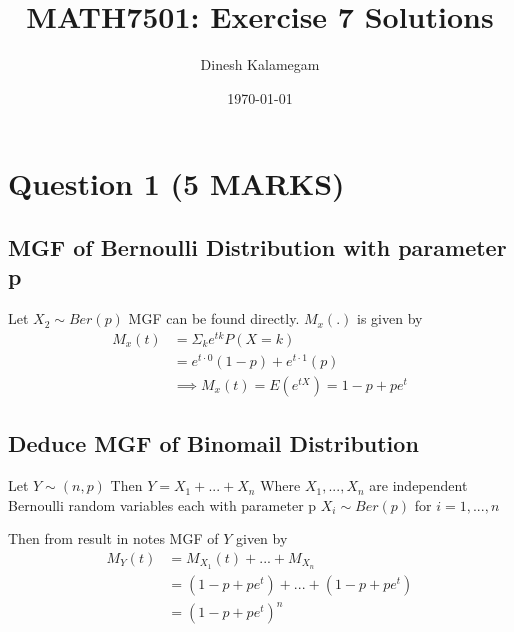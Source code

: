 \documentclass[11pt]{article}
\begin{document}
\title{MATH7501: Exercise 7 Solutions}
\author{Dinesh Kalamegam}
\date{\today}
\maketitle

\renewcommand\qedsymbol{\textbf{\emph{Quod Erat Demonstrandum}}}
\setlength{\parindent}{0pt}
\setlength{\parskip}{\baselineskip}
\newtheorem{theorem}{Theorem}[section]
\newtheorem{definition}[theorem]{Defintion}
\newtheorem{proposition}[theorem]{Proposition}
\newtheorem{corollary}[theorem]{Corollary}

\section{Question 1 (5 MARKS)}
\subsection{MGF of Bernoulli Distribution with parameter p}
Let $X_2 \sim Ber(p)$ MGF can be found directly. $M_{x}(.)$ is given by
\begin{align*}
  M_{x}(t) &= \Sigma_{k}e^{tk}P(X=k) \\
           &= e^{t \cdot 0} (1-p) + e^{t \cdot 1}(p) \\
           &\boxed{\implies M_{x}(t) = E(e^{tX})=1-p+pe^{t}}
\end{align*}
\subsection{Deduce MGF of Binomail Distribution}
Let $Y \sim (n,p)$ Then $Y= X_{1} +...+ X_{n}$ Where $X_{1},...,X_{n}$ are independent Bernoulli random variables each with parameter p $X_{i} \sim Ber(p)$ for $i=1,...,n$

Then from result in notes MGF of $Y$ given by
\begin{align*}
  M_{Y}(t) &= M_{X_{1}}(t) + ... + M_{X_{n}} \\
           &= (1-p+pe^{t}) + ... + (1-p+pe^{t}) \\
           &= \boxed{(1-p+pe^{t})^{n}}
\end{align*}
\end{document}
